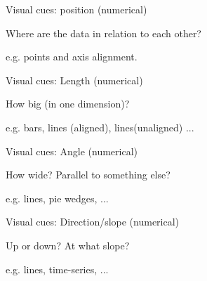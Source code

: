 \documentclass[table]{beamer}\usepackage[]{graphicx}\usepackage[]{color}
\begin{document}

\begin{frame}[fragile]{Visual cues: position (numerical)}

\begin{block}{Where are the data in relation to each other?}

e.g. points and axis alignment.
\end{block}

\vspace{15em}

\end{frame}


\begin{frame}[fragile]{Visual cues: Length (numerical)}

\begin{block}{How big (in one dimension)?}

e.g. bars, lines (aligned), lines(unaligned) ...

\end{block}

\vspace{15em}

\end{frame}



\begin{frame}[fragile]{Visual cues: Angle (numerical)}

\begin{block}{How wide? Parallel to something else?}

e.g. lines, pie wedges, ...

\end{block}

\vspace{15em}

\end{frame}


\begin{frame}[fragile]{Visual cues: Direction/slope (numerical)}

\begin{block}{Up or down? At what slope?}

e.g. lines, time-series, ...

\end{block}

\vspace{15em}

\end{frame}
\end{document}
